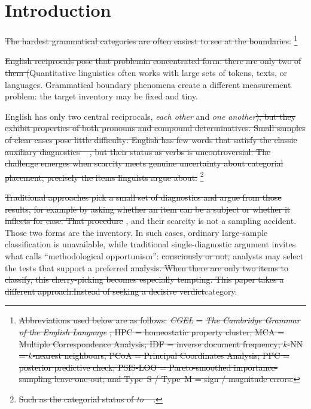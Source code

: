 \documentclass[12pt]{article}
\providecommand{\mention}[1]{\textit{#1}}
\providecommand{\abbr}[1]{\textsc{#1}}
\providecommand{\DIFaddtex}[1]{{\protect\color{DIFgreen}#1}} %
\providecommand{\DIFdeltex}[1]{{\protect\color{red}\sout{#1}}}                      %
\providecommand{\DIFaddbegin}{} %
\providecommand{\DIFaddend}{} %
\providecommand{\DIFdelbegin}{} %
\providecommand{\DIFdelend}{} %
\providecommand{\DIFadd}[1]{\texorpdfstring{\DIFaddtex{#1}}{#1}} %
\providecommand{\DIFdel}[1]{\texorpdfstring{\DIFdeltex{#1}}{}} %
\newcommand{\DIFscaledelfig}{0.5}
\newlength{\DIFdelgraphicswidth} %
\newlength{\DIFdelgraphicsheight} %
\newcommand{\DIFaddincludegraphics}[2][]{{\color{DIFgreen}\fbox{\DIFOincludegraphics[#1]{#2}}}} %
\newcommand{\DIFdelincludegraphics}[2][]{%
\sbox{\DIFdelgraphicsbox}{\DIFOincludegraphics[#1]{#2}}%
\settoboxwidth{\DIFdelgraphicswidth}{\DIFdelgraphicsbox} %
\settoboxtotalheight{\DIFdelgraphicsheight}{\DIFdelgraphicsbox} %
\scalebox{\DIFscaledelfig}{%
\parbox[b]{\DIFdelgraphicswidth}{\usebox{\DIFdelgraphicsbox}\\[-\baselineskip] \rule{\DIFdelgraphicswidth}{0em}}\llap{\resizebox{\DIFdelgraphicswidth}{\DIFdelgraphicsheight}{%
\setlength{\unitlength}{\DIFdelgraphicswidth}%
\begin{picture}(1,1)%
\thicklines\linethickness{2pt} %
{\color[rgb]{1,0,0}\put(0,0){\framebox(1,1){}}}%
{\color[rgb]{1,0,0}\put(0,0){\line( 1,1){1}}}%
{\color[rgb]{1,0,0}\put(0,1){\line(1,-1){1}}}%
\end{picture}%
}\hspace*{3pt}}} %
} %
\DeclareRobustCommand{\DIFaddbegin}{\DIFOaddbegin \let\includegraphics\DIFaddincludegraphics} %
\DeclareRobustCommand{\DIFaddend}{\DIFOaddend \let\includegraphics\DIFOincludegraphics} %
\DeclareRobustCommand{\DIFdelbegin}{\DIFOdelbegin \let\includegraphics\DIFdelincludegraphics} %
\DeclareRobustCommand{\DIFdelend}{\DIFOaddend \let\includegraphics\DIFOincludegraphics} %
\begin{document}
\section{Introduction}

\DIFdelbegin \DIFdel{The hardest grammatical categories are often easiest to see at the boundaries. }\footnote{\DIFdel{Abbreviations used below are as follows: }\textit{\DIFdel{CGEL}} %
\DIFdel{= }\textit{\DIFdel{The Cambridge Grammar of the English Language}}%
\DIFdel{; \abbr{HPC} = homeostatic property cluster; \abbr{MCA} = Multiple Correspondence Analysis; \abbr{IDF} = inverse document frequency; $k$-\abbr{NN} = $k$-nearest neighbours; \abbr{PCoA} = Principal Coordinates Analysis; \abbr{PPC} = posterior predictive check; \abbr{PSIS-LOO} = Pareto-smoothed importance-sampling leave-one-out; and Type~S / Type~M = sign / magnitude errors.}} %
\addtocounter{footnote}{-1}%
\DIFdel{English reciprocals pose that problemin concentrated form: there are only two of them (}\DIFdelend \DIFaddbegin \DIFadd{Quantitative linguistics often works with large sets of tokens, texts, or languages. Grammatical boundary phenomena create a different measurement problem: the target inventory may be fixed and tiny.
}

\DIFadd{English has only two central reciprocals, }\DIFaddend \mention{each other} and \mention{one another}\DIFdelbegin \DIFdel{), but they exhibit properties of both pronouns and compound determinatives. Small samples of clear cases pose little difficulty: English has few words that satisfy the classic auxiliary diagnostics \mbox{%
\parencite{sag2020lessons}}\hskip0pt%
, but their status as verbs is uncontroversial. The challenge emerges when scarcity meets genuine uncertainty about categorial placement, precisely the items linguists argue about. }\footnote{\DIFdel{Such as the categorial status of \mention{to} \mbox{%
\parencite{levine2012toscompany}}\hskip0pt%
.}}
\addtocounter{footnote}{-1}%

\DIFdel{Traditional approaches pick a small set of diagnostics and argue from those results, for example by asking whether an item can be a subject or whether it inflects for case. That procedure }\DIFdelend \DIFaddbegin \DIFadd{, and their scarcity is not a sampling accident. Those two forms are the inventory. In such cases, ordinary large-sample classification is unavailable, while traditional single-diagnostic argument }\DIFaddend invites what \textcite{croft2001radical} calls \enquote{methodological opportunism}: \DIFdelbegin \DIFdel{consciously or not, }\DIFdelend analysts may select \DIFaddbegin \DIFadd{the }\DIFaddend tests that support a preferred \DIFdelbegin \DIFdel{analysis.
When there are only two items to classify, this cherry-picking becomes especially tempting. This paper takes a different approach.Instead of seeking a decisive verdict}\DIFdelend \DIFaddbegin \DIFadd{category.
}
\end{document}
